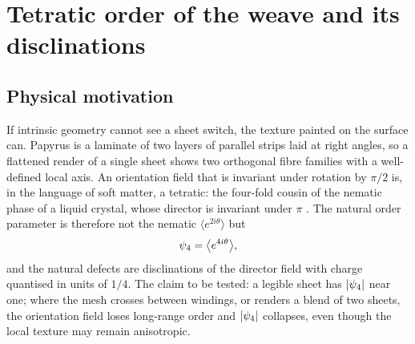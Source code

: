 \section{Tetratic order of the weave and its disclinations}
\label{sec:tetratic}

\subsection{Physical motivation}
If intrinsic geometry cannot see a sheet switch, the texture painted on the surface can. Papyrus is a laminate of two layers of parallel strips laid at right angles, so a flattened render of a single sheet shows two orthogonal fibre families with a well-defined local axis. An orientation field that is invariant under rotation by $\pi/2$ is, in the language of soft matter, a tetratic: the four-fold cousin of the nematic phase of a liquid crystal, whose director is invariant under $\pi$ \cite{degennes}. The natural order parameter is therefore not the nematic $\langle e^{2i\theta}\rangle$ but
\begin{equation}
\psi_4=\bigl\langle e^{4i\theta}\bigr\rangle ,
\label{eq:psi4}
\end{equation}
and the natural defects are disclinations of the director field with charge quantised in units of $1/4$. The claim to be tested: a legible sheet has $|\psi_4|$ near one; where the mesh crosses between windings, or renders a blend of two sheets, the orientation field loses long-range order and $|\psi_4|$ collapses, even though the local texture may remain anisotropic.

